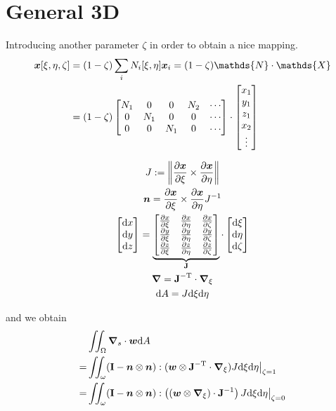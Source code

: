 \documentclass[a4paper,11pt]{article}
\renewcommand{\to}[1]{\text{\boldmath $#1$}} %
\newcommand{\ts}[1]{\text{\boldmath $\mathrm{#1}$}} %
\newcommand{\uv}[1]{\mathds{#1}}
\newcommand{\um}[1]{\mathds{#1}}
\newcommand{\intd}[1]{\mathrm{d}#1}
\newcommand{\pderiv}[2]{\frac{\partial#1}{\partial#2}}
\newcommand{\norm}[1]{\left\lVert{#1}\right\rVert}
\newcommand{\T}{\mathrm{T}}
\newcommand{\defeq}{:=}
\begin{document}
\section{General 3D}

Introducing another parameter $\zeta$ in order to obtain a nice mapping.
\begin{align}
 \to x[\xi,\eta,\zeta] &= (1-\zeta)\sum_i N_i[\xi,\eta]\to x_i = (1-\zeta) \um N \cdot \uv X\\
  &= (1-\zeta) \begin{bmatrix}N_1 & 0 & 0 & N_2 & \cdots\\0&N_1&0&0&\cdots\\0&0&N_1&0&\cdots\end{bmatrix}\cdot\begin{bmatrix}x_1\\y_1\\z_1\\x_2\\\vdots\end{bmatrix}
\end{align}

\begin{gather}
 J \defeq \norm{\pderiv{\to x}{\xi} \times  \pderiv{\to x}{\eta}}\\
 \to n = \pderiv{\to x}{\xi} \times \pderiv{\to x}{\eta} J^{-1}\\
 \begin{bmatrix}\intd x\\ \intd y\\ \intd z\end{bmatrix} =
  \underbrace{\begin{bmatrix}\pderiv{x}{\xi} & \pderiv{x}{\eta} & \pderiv{x}{\zeta}\\
	  \pderiv{y}{\xi} & \pderiv{y}{\eta} & \pderiv{y}{\zeta}\\
	  \pderiv{z}{\xi} & \pderiv{z}{\eta} & \pderiv{z}{\zeta} \end{bmatrix}}_{\ts J}
  \cdot \begin{bmatrix}\intd \xi \\ \intd \eta \\ \intd \zeta\end{bmatrix}\\
 \to\nabla = \ts J^{-\T}\cdot\to\nabla_\xi\\
 \intd A = J \intd \xi \intd \eta 
\end{gather}

and we obtain
\begin{align}
 &\iint_\Omega\to \nabla_s\cdot\to w\intd A\\
=&\iint_\omega(\ts I-\to n\otimes\to n):(\to w\otimes \ts J^{-\T}\cdot\to\nabla_\xi)J\intd\xi\intd\eta\big|_{\zeta=1}\\
=&\iint_\omega(\ts I-\to n\otimes\to n):\left((\to w\otimes\to\nabla_\xi) \cdot\ts J^{-1}\right)J\intd\xi\intd\eta\big|_{\zeta=0}
\end{align}
\end{document}
